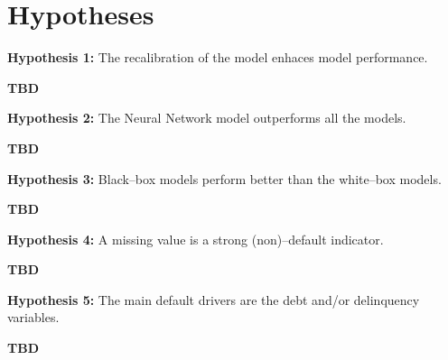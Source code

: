 \chapter{Hypotheses}
\label{chap:four}


\noindent \textbf{Hypothesis 1:} The recalibration of the model enhaces model performance.

\textbf{TBD}

\noindent \textbf{Hypothesis 2:} The Neural Network model outperforms all the models.

\textbf{TBD}

\noindent \textbf{Hypothesis 3:} Black--box models perform better than the white--box models.

\textbf{TBD}

\noindent \textbf{Hypothesis 4:} A missing value is a strong (non)--default indicator.

\textbf{TBD}

\noindent \textbf{Hypothesis 5:} The main default drivers are the debt and/or delinquency variables.

\textbf{TBD}

